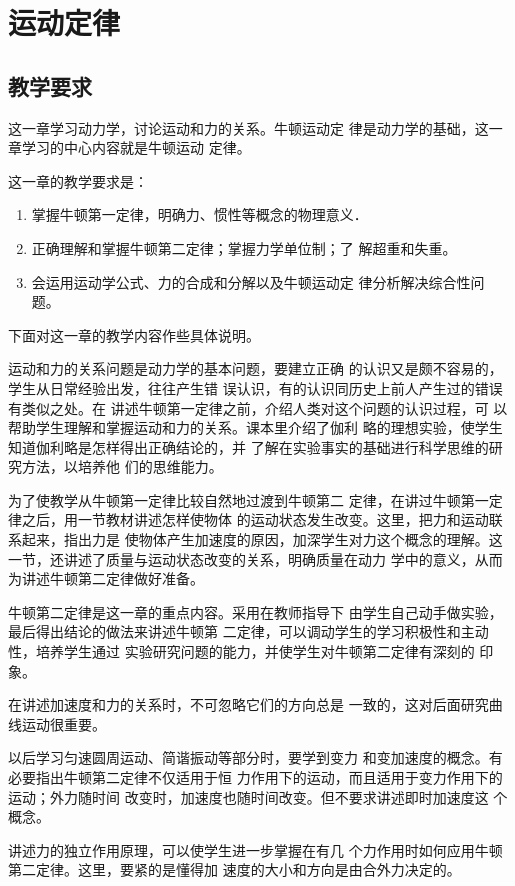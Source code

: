 
\chapter{运动定律}
\section{教学要求}
这一章学习动力学，讨论运动和力的关系。牛顿运动定
律是动力学的基础，这一章学习的中心内容就是牛顿运动
定律。

这一章的教学要求是：
\begin{enumerate}

\item 掌握牛顿第一定律，明确力、惯性等概念的物理意义．
\item 正确理解和掌握牛顿第二定律；掌握力学单位制；了
解超重和失重。
\item 会运用运动学公式、力的合成和分解以及牛顿运动定
律分析解决综合性问题。
\end{enumerate}

下面对这一章的教学内容作些具体说明。

运动和力的关系问题是动力学的基本问题，要建立正确
的认识又是颇不容易的，学生从日常经验出发，往往产生错
误认识，有的认识同历史上前人产生过的错误有类似之处。在
讲述牛顿第一定律之前，介绍人类对这个问题的认识过程，可
以帮助学生理解和掌握运动和力的关系。课本里介绍了伽利
略的理想实验，使学生知道伽利略是怎样得出正确结论的，并
了解在实验事实的基础进行科学思维的研究方法，以培养他
们的思维能力。

为了使教学从牛顿第一定律比较自然地过渡到牛顿第二
定律，在讲过牛顿第一定律之后，用一节教材讲述怎样使物体
的运动状态发生改变。这里，把力和运动联系起来，指出力是
使物体产生加速度的原因，加深学生对力这个概念的理解。这
一节，还讲述了质量与运动状态改变的关系，明确质量在动力
学中的意义，从而为讲述牛顿第二定律做好准备。

牛顿第二定律是这一章的重点内容。采用在教师指导下
由学生自己动手做实验，最后得出结论的做法来讲述牛顿第
二定律，可以调动学生的学习积极性和主动性，培养学生通过
实验研究问题的能力，并使学生对牛顿第二定律有深刻的
印象。

在讲述加速度和力的关系时，不可忽略它们的方向总是
一致的，这对后面研究曲线运动很重要。

以后学习匀速圆周运动、简谐振动等部分时，要学到变力
和变加速度的概念。有必要指出牛顿第二定律不仅适用于恒
力作用下的运动，而且适用于变力作用下的运动；外力随时间
改变时，加速度也随时间改变。但不要求讲述即时加速度这
个概念。

讲述力的独立作用原理，可以使学生进一步掌握在有几
个力作用时如何应用牛顿第二定律。这里，要紧的是懂得加
速度的大小和方向是由合外力决定的。

